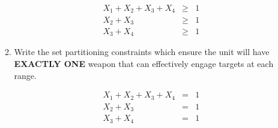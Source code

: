 \documentclass[10pt]{article}
\begin{document}
\begin{enumerate}
\begin{enumerate}
\begin{eqnarray}
X_1 + X_2 + X_3 + X_4 &\ge& 1 \nonumber \\
X_2 + X_3 &\ge& 1 \nonumber \\
X_3 + X_4 &\ge& 1 \nonumber
\end{eqnarray}

\vfill

\item {} Write the set partitioning constraints which ensure the unit will have {\bf EXACTLY ONE} weapon that can effectively engage targets at each range.

\begin{eqnarray}
X_1 + X_2 + X_3 + X_4 &=& 1 \nonumber \\
X_2 + X_3 &=& 1 \nonumber \\
X_3 + X_4 &=& 1 \nonumber
\end{eqnarray}

\vfill

\end{enumerate}



\end{enumerate}
\end{document}
